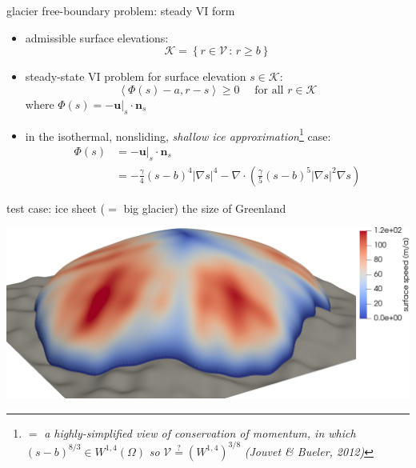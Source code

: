 \documentclass[svgnames,
               hyperref={colorlinks,citecolor=DeepPink4,linkcolor=FireBrick,urlcolor=Maroon},
               usepdftitle=false]  %
               {beamer}
\newcommand{\grad}{\nabla}
\newcommand{\bn}{\mathbf{n}}
\newcommand{\bu}{\mathbf{u}}
\newcommand{\ip}[2]{\left<#1,#2\right>}
\begin{document}
\begin{frame}{glacier free-boundary problem: steady VI form}

\begin{itemize}
\item admissible surface elevations:
    $$\mathcal{K} = \left\{r \in \mathcal{V} \,:\, r \ge b\right\}$$
\item steady-state VI problem for surface elevation $s\in\mathcal{K}$:
	$$\ip{\Phi(s) - a}{r-s} \ge 0 \quad \text{ for all } r \in \mathcal{K}$$
where $\Phi(s)=- \bu|_s \cdot \bn_s$
\item in the isothermal, nonsliding, \emph{shallow ice approximation}\footnote{$=$ \emph{a highly-simplified view of conservation of momentum, in which} $(s-b)^{8/3} \in W^{1,4}(\Omega)$ \emph{so} $\mathcal{V} \stackrel{?}{=} (W^{1,4})^{3/8}$ \hfill \emph{(Jouvet \& Bueler, 2012)}} case:
\begin{align*}
\Phi(s) &= - \bu|_s \cdot \bn_s \\
        &= - \frac{\gamma}{4} (s-b)^{4} |\grad s|^{4} - \grad \cdot\left(\frac{\gamma}{5} (s-b)^{5} |\grad s|^{2} \grad s\right)
\end{align*}
\end{itemize}
\end{frame}


\begin{frame}{test case: ice sheet ($=$ big glacier) the size of Greenland}

\centering
\includegraphics[width=\textwidth]{../paper/fixfigs/sialev8scene.png}
\end{frame}
\end{document}
